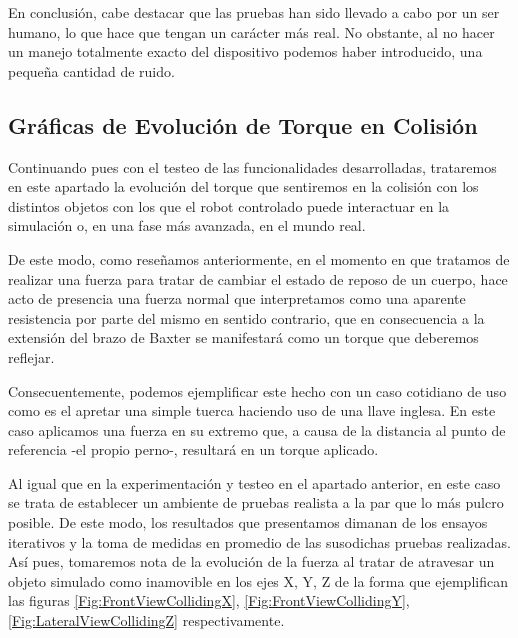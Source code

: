 En conclusión, cabe destacar que las pruebas han sido llevado a cabo por un ser humano, lo que hace que tengan un carácter más real. No obstante, al no hacer un manejo totalmente exacto del dispositivo podemos haber introducido, una pequeña cantidad de ruido.

\subsection{Gráficas de Evolución de Torque en Colisión}
Continuando pues con el testeo de las funcionalidades desarrolladas, trataremos en este apartado la evolución del torque que sentiremos en la colisión con los distintos objetos con los que el robot controlado puede interactuar en la simulación o, en una fase más avanzada, en el mundo real.

De este modo, como reseñamos anteriormente, en el momento en que tratamos de realizar una fuerza para tratar de cambiar el estado de reposo de un cuerpo, hace acto de presencia una fuerza normal que interpretamos como una aparente resistencia por parte del mismo en sentido contrario, que en consecuencia a la extensión del brazo de Baxter se manifestará como un torque que deberemos reflejar. 

Consecuentemente, podemos ejemplificar este hecho con un caso cotidiano de uso como es el apretar una simple tuerca haciendo uso de una llave inglesa. En este caso aplicamos una fuerza en su extremo que, a causa de la distancia al punto de referencia -el propio perno-, resultará en un torque aplicado. 

Al igual que en la experimentación y testeo en el apartado anterior, en este caso se trata de establecer un ambiente de pruebas realista a la par que lo más pulcro posible. De este modo, los resultados que presentamos dimanan de los ensayos iterativos y la toma de medidas en promedio de las susodichas pruebas realizadas. Así pues, tomaremos nota de la evolución de la fuerza al tratar de atravesar un objeto simulado como inamovible en los ejes X, Y, Z de la forma que ejemplifican las figuras \ref{Fig:FrontViewCollidingX},  \ref{Fig:FrontViewCollidingY},  \ref{Fig:LateralViewCollidingZ} respectivamente.

